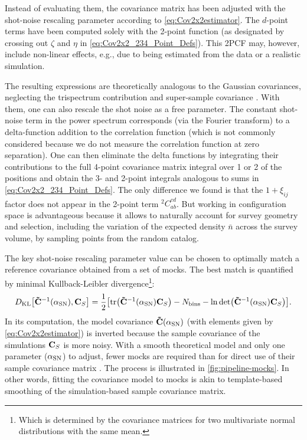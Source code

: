Instead of evaluating them, the covariance matrix has been adjusted with the shot-noise rescaling parameter according to \cref{eq:Cov2x2estimator}.
The $d$-point terms have been computed solely with the 2-point function (as designated by crossing out $\zeta$ and $\eta$ in \cref{eq:Cov2x2_234_Point_Defs}).
This 2PCF may, however, include non-linear effects, e.g., due to being estimated from the data or a realistic simulation.

The resulting expressions are theoretically analogous to the Gaussian covariances, neglecting the trispectrum contribution and super-sample covariance \citep[e.g.,][]{gaussian-covariances-galaxy-clustering}.
With them, one can also rescale the shot noise as a free parameter.
The constant shot-noise term in the power spectrum corresponds (via the Fourier transform) to a delta-function addition to the correlation function (which is not commonly considered because we do not measure the correlation function at zero separation).
One can then eliminate the delta functions by integrating their contributions to the full 4-point covariance matrix integral over 1 or 2 of the positions and obtain the 3- and 2-point integrals analogous to sums in \cref{eq:Cov2x2_234_Point_Defs}.
The only difference we found is that the $1+\xi_{ij}$ factor does not appear in the 2-point term ${^2C}_{ab}^{cd}$.
But working in configuration space is advantageous because it allows to naturally account for survey geometry and selection, including the variation of the expected density $\bar n$ across the survey volume, by sampling points from the random catalog.


The key shot-noise rescaling parameter value can be chosen to optimally match a reference covariance obtained from a set of mocks.
The best match is quantified by minimal Kullback-Leibler divergence\footnote{Which is determined by the covariance matrices for two multivariate normal distributions with the same mean.}:
\begin{equation} \label{eq:D_KL-fit-mocks}
    D_{\rm KL} \qty[{\bf \tilde C}^{-1}\qty(\alpha_{\rm SN}), {\bf C}_S] = \frac12 \qty[\tr({\bf \tilde C}^{-1}\qty(\alpha_{\rm SN}) {\bf C}_S) - N_{\rm bins} - \ln \det({\bf \tilde C}^{-1}\qty(\alpha_{\rm SN}) {\bf C}_S)].
\end{equation}
In its computation, the model covariance ${\bf \tilde C}\qty(\alpha_{\rm SN})$ (with elements given by \cref{eq:Cov2x2estimator}) is inverted because the sample covariance of the simulations ${\bf C}_S$ is more noisy.
With a smooth theoretical model and only one parameter ($\alpha_{\rm SN}$) to adjust, fewer mocks are required than for direct use of their sample covariance matrix \citep{rascal}.
The process is illustrated in \cref{fig:pipeline-mocks}.
In other words, fitting the \rascalc{} covariance model to mocks is akin to template-based smoothing of the simulation-based sample covariance matrix.

